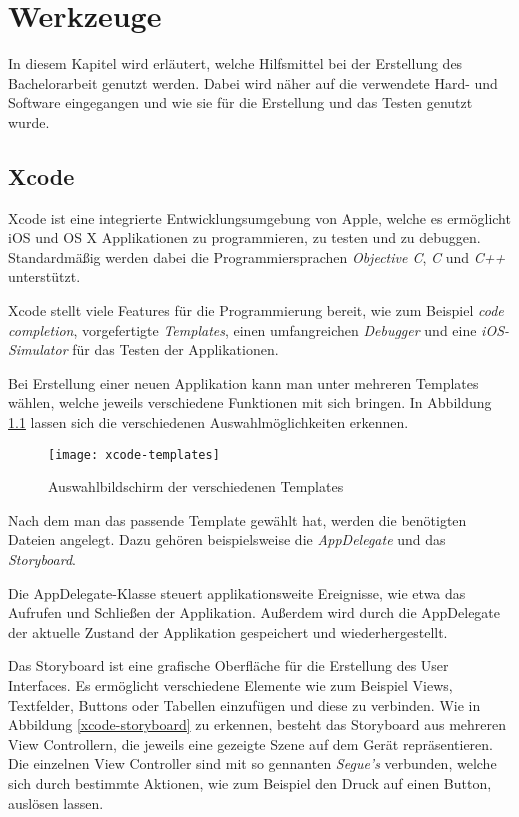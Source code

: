 \chapter{Werkzeuge}
\label{chap:tools}
In diesem Kapitel wird erläutert, welche Hilfsmittel bei der Erstellung des Bachelorarbeit genutzt werden.
Dabei wird näher auf die verwendete Hard- und Software eingegangen und wie sie für die Erstellung und das Testen genutzt wurde.


\section{Xcode}
\label{sec:tools:xcode}
Xcode ist eine integrierte Entwicklungsumgebung von Apple, welche es ermöglicht iOS und OS X Applikationen zu programmieren, zu testen und zu debuggen.
Standardmäßig werden dabei die Programmiersprachen \emph{Objective C}, \emph{C} und \emph{C++} unterstützt.

Xcode stellt viele Features für die Programmierung bereit, wie zum Beispiel \emph{code completion}, vorgefertigte \emph{Templates}, einen umfangreichen \emph{Debugger} und eine \emph{iOS-Simulator} für das Testen der Applikationen.

Bei Erstellung einer neuen Applikation kann man unter mehreren Templates wählen, welche jeweils verschiedene Funktionen mit sich bringen. In Abbildung \ref{xcode-templates} lassen sich die verschiedenen Auswahlmöglichkeiten erkennen.

\begin{figure}[htb!]
		\centering
	\texttt{[image: xcode-templates]}
	\caption{Auswahlbildschirm der verschiedenen Templates}
	\label{xcode-templates}
\end{figure}

Nach dem man das passende Template gewählt hat, werden die benötigten Dateien angelegt.
Dazu gehören beispielsweise die \emph{AppDelegate} und das \emph{Storyboard}.

Die AppDelegate-Klasse steuert applikationsweite Ereignisse, wie etwa das Aufrufen und Schließen der Applikation. Außerdem wird durch die AppDelegate der aktuelle Zustand der Applikation gespeichert und wiederhergestellt.

Das Storyboard ist eine grafische Oberfläche für die Erstellung des User Interfaces. Es ermöglicht verschiedene Elemente wie zum Beispiel Views, Textfelder, Buttons oder Tabellen einzufügen und diese zu verbinden. Wie in Abbildung \ref{xcode-storyboard} zu erkennen, besteht das Storyboard aus mehreren View Controllern, die jeweils eine gezeigte Szene auf dem Gerät repräsentieren. Die einzelnen View Controller sind mit so gennanten \emph{Segue's} verbunden, welche sich durch bestimmte Aktionen, wie zum Beispiel den Druck auf einen Button, auslösen lassen.

